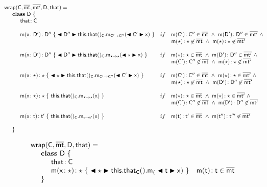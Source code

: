 \documentclass[acmlarge, anonymous, authordraft]{acmart}
\begin{document}
\vspace{4mm}
\[\begin{array}{@{}ll@{}l@{}r@{~}c@{~}r}
    \wrap\C\bmt\bmtp\D\that = \\
\SP \class ~\D ~ \{\\
\SPP \Fdef\that\C \\
\\
\SPP \Mdef\m\x\Dp\Dpp {~\bscast\Dpp{{\KCall{\this.\that()_{\C}} \m {\bscast{\Cp}\x}\Cp\Cpp }}~}
&     if\,\,\,\,\,\, \Mtype\m\Cp\Cpp\in\bmt ~\wedge~ \Mtype\m\Dp\Dpp\in\bmtp ~\wedge~ \\
&     \multicolumn{5}{l}{\qquad \Mtype\m\any\any\not\in\bmt ~\wedge~ \Mtype\m\any\any\not\in\bmtp} \\
\\
\SPP \Mdef\m\x\Dp\Dpp{~\bscast\Dpp{\KCall{\this.\that()_{\C}} \m {\bscast\any\x}\any\any }~}
&    if\,\,\,\,\,\, \Mtype\m\any\any\in\bmt ~\wedge~ \Mtype\m\Dp\Dpp\in\bmtp ~\wedge~  \\
&     \multicolumn{5}{l}{\qquad \Mtype\m\Cp\Cpp\not\in\bmt ~\wedge~  \Mtype\m\any\any\not\in\bmtp } \\
\\
\SPP \Mdef\m\x\any\any{~\bscast\any{\KCall{\this.\that()_{\C}}\m{\bscast{\Cp}\x}\Cp\Cpp}~}
&    if\,\,\,\,\,\, \Mtype\m\Cp\Cpp\in\bmt ~\wedge~ \Mtype\m\any\any\in\bmtp ~\wedge~   \\
&     \multicolumn{5}{l}{\qquad \Mtype\m\any\any\not\in\bmt ~\wedge~  \Mtype\m\Dp\Dpp\not\in\bmtp } \\
\\
\SPP \Mdef\m\x\any\any{~{\KCall{\this.\that()_{\C}}\m{\x}\any\any}~}
&    if\,\,\,\,\,\, \Mtype\m\any\any\in\bmt ~\wedge~ \Mtype\m\any\any\in\bmtp ~\wedge~ \\
&     \multicolumn{5}{l}{\qquad \Mtype\m\Cp\Cpp\not\in\bmt ~\wedge~ \Mtype\m\Dp\Dpp\not\in\bmtp} \\
\\
\SPP \Mdef\m\x{\t}{\tp}{~\KCall{\this.\that()_{\C}}\m{\x}\t\tp~}
&    if\,\,\,\,\,\, \Mtype\m\t\tp\in\bmt ~\wedge~ \Mtype\m\tpp\tppp\not\in \bmtp \\
\\
\SP \}
\\
\end{array}\]

\[\begin{array}{@{}ll@{}l@{}r@{~}c@{~}r}
\wrapAny\C\bmt\D\that = \\
\SP \class~\D~\{\\
\SPP \Fdef \that \C\\ 
\SPP   \Mdef\m\x\any\any {~\bscast\any{\Call{\Get\this\that\C}{\m_}{\bscast{\t}\x} }~}
&  \Mtype\m\t\t\in\b\mt \\
\SP \}\\
\end{array}\]
\end{document}
